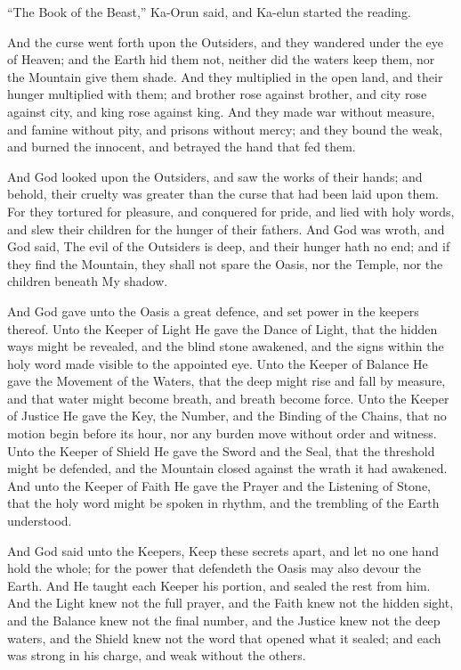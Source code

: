 ``The Book of the Beast,'' Ka-Orun said, and Ka-elun started the reading.\par
 
\begin{scripture}
And the curse went forth upon the Outsiders, and they wandered under the eye of Heaven; and the Earth hid them not, neither did the waters keep them, nor the Mountain give them shade.
And they multiplied in the open land, and their hunger multiplied with them; and brother rose against brother, and city rose against city, and king rose against king.
And they made war without measure, and famine without pity, and prisons without mercy; and they bound the weak, and burned the innocent, and betrayed the hand that fed them.
\end{scripture}
 
\begin{scripture}
And God looked upon the Outsiders, and saw the works of their hands; and behold, their cruelty was greater than the curse that had been laid upon them.
For they tortured for pleasure, and conquered for pride, and lied with holy words, and slew their children for the hunger of their fathers.
And God was wroth, and God said, The evil of the Outsiders is deep, and their hunger hath no end; and if they find the Mountain, they shall not spare the Oasis, nor the Temple, nor the children beneath My shadow.
\end{scripture}
 
\begin{scripture}
And God gave unto the Oasis a great defence, and set power in the keepers thereof.
Unto the Keeper of Light He gave the Dance of Light, that the hidden ways might be revealed, and the blind stone awakened, and the signs within the holy word made visible to the appointed eye.
Unto the Keeper of Balance He gave the Movement of the Waters, that the deep might rise and fall by measure, and that water might become breath, and breath become force.
Unto the Keeper of Justice He gave the Key, the Number, and the Binding of the Chains, that no motion begin before its hour, nor any burden move without order and witness.
Unto the Keeper of Shield He gave the Sword and the Seal, that the threshold might be defended, and the Mountain closed against the wrath it had awakened.
And unto the Keeper of Faith He gave the Prayer and the Listening of Stone, that the holy word might be spoken in rhythm, and the trembling of the Earth understood.
\end{scripture}
 
\begin{scripture}
And God said unto the Keepers, Keep these secrets apart, and let no one hand hold the whole; for the power that defendeth the Oasis may also devour the Earth.
And He taught each Keeper his portion, and sealed the rest from him.
And the Light knew not the full prayer, and the Faith knew not the hidden sight, and the Balance knew not the final number, and the Justice knew not the deep waters, and the Shield knew not the word that opened what it sealed; and each was strong in his charge, and weak without the others.
\end{scripture}
 
